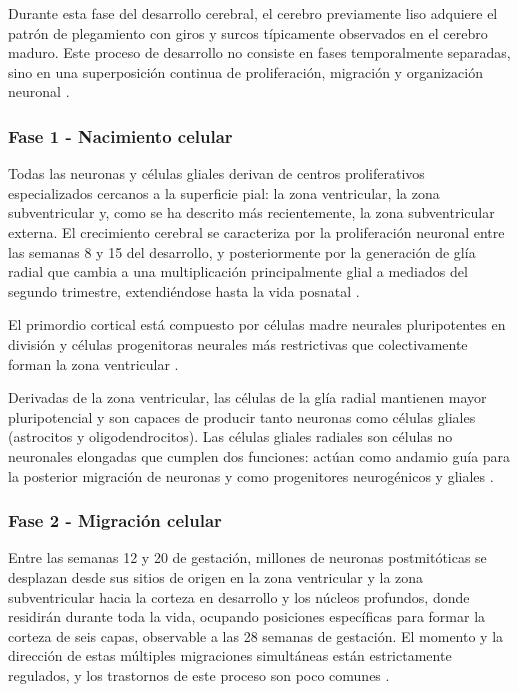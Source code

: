 Durante esta fase del desarrollo cerebral, el cerebro previamente liso adquiere
el patrón de plegamiento con giros y surcos típicamente observados en el
cerebro maduro. Este proceso de desarrollo no consiste en fases temporalmente
separadas, sino en una superposición continua de proliferación, migración y
organización neuronal \cite{Gibb2018}.

\subsubsection{Fase 1 - Nacimiento celular}
Todas las neuronas y células gliales derivan de centros proliferativos
especializados cercanos a la superficie pial: la zona ventricular, la zona
subventricular y, como se ha descrito más recientemente, la zona subventricular
externa. El crecimiento cerebral se caracteriza por la proliferación neuronal
entre las semanas 8 y 15 del desarrollo, y posteriormente por la generación de
glía radial que cambia a una multiplicación principalmente glial a mediados del
segundo trimestre, extendiéndose hasta la vida posnatal \cite{Polin124}.

El primordio cortical está compuesto por células madre neurales pluripotentes
en división y células progenitoras neurales más restrictivas que colectivamente
forman la zona ventricular \cite{Polin124}.

Derivadas de la zona ventricular, las células de la glía radial mantienen mayor
pluripotencial y son capaces de producir tanto neuronas como células gliales
(astrocitos y oligodendrocitos). Las células gliales radiales son células no
neuronales elongadas que cumplen dos funciones: actúan como andamio guía para
la posterior migración de neuronas y como progenitores neurogénicos y gliales
\cite{Polin124}.

\subsubsection{Fase 2 - Migración celular}
Entre las semanas 12 y 20 de gestación, millones de neuronas postmitóticas se
desplazan desde sus sitios de origen en la zona ventricular y la zona
subventricular hacia la corteza en desarrollo y los núcleos profundos, donde
residirán durante toda la vida, ocupando posiciones específicas para formar la
corteza de seis capas, observable a las 28 semanas de gestación. El momento y
la dirección de estas múltiples migraciones simultáneas están estrictamente
regulados, y los trastornos de este proceso son poco comunes \cite{Polin124}.

